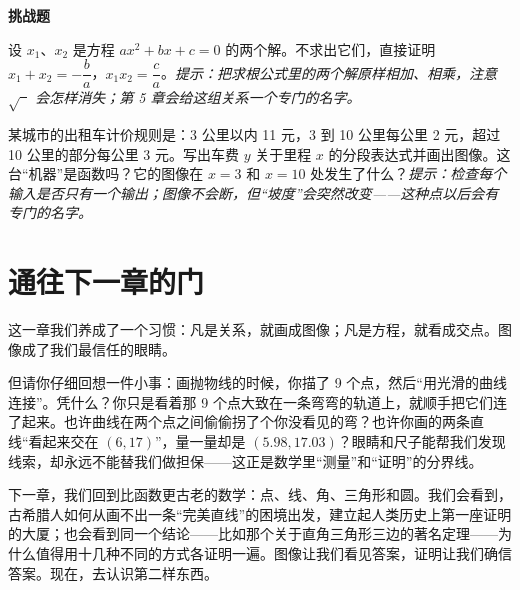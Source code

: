 \textbf{挑战题}
\begin{sikao}
\item 设 $x_1$、$x_2$ 是方程 $ax^2 + bx + c = 0$ 的两个解。不求出它们，直接证明 $x_1 + x_2 = -\dfrac{b}{a}$，$x_1 x_2 = \dfrac{c}{a}$。\emph{提示：把求根公式里的两个解原样相加、相乘，注意 $\sqrt{\phantom{a}}$ 会怎样消失；第 5 章会给这组关系一个专门的名字。}
\item 某城市的出租车计价规则是：3 公里以内 11 元，3 到 10 公里每公里 2 元，超过 10 公里的部分每公里 3 元。写出车费 $y$ 关于里程 $x$ 的分段表达式并画出图像。这台“机器”是函数吗？它的图像在 $x = 3$ 和 $x = 10$ 处发生了什么？\emph{提示：检查每个输入是否只有一个输出；图像不会断，但“坡度”会突然改变——这种点以后会有专门的名字。}
\end{sikao}

\section*{通往下一章的门}

这一章我们养成了一个习惯：凡是关系，就画成图像；凡是方程，就看成交点。图像成了我们最信任的眼睛。

但请你仔细回想一件小事：画抛物线的时候，你描了 9 个点，然后“用光滑的曲线连接”。凭什么？你只是看着那 9 个点大致在一条弯弯的轨道上，就顺手把它们连了起来。也许曲线在两个点之间偷偷拐了个你没看见的弯？也许你画的两条直线“看起来交在 $(6, 17)$”，量一量却是 $(5.98, 17.03)$？眼睛和尺子能帮我们发现线索，却永远不能替我们做担保——这正是数学里“测量”和“证明”的分界线。

下一章，我们回到比函数更古老的数学：点、线、角、三角形和圆。我们会看到，古希腊人如何从画不出一条“完美直线”的困境出发，建立起人类历史上第一座证明的大厦；也会看到同一个结论——比如那个关于直角三角形三边的著名定理——为什么值得用十几种不同的方式各证明一遍。图像让我们看见答案，证明让我们确信答案。现在，去认识第二样东西。
